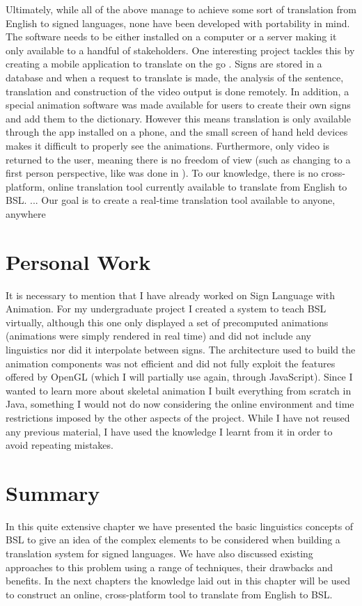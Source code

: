 \documentclass[12pt]{ociamthesis}  %
\begin{document}
Ultimately, while all of the above manage to achieve some sort of translation from English to signed languages, none have been developed with portability in mind. The software needs to be either installed on a computer or a server making it only available to a handful of stakeholders. One interesting project tackles this by creating a mobile application to translate on the go . Signs are stored in a database and when a request to translate is made, the analysis of the sentence, translation and construction of the video output is done remotely. In addition, a special animation software was made available for users to create their own signs and add them to the dictionary. However this means translation is only available through the app installed on a phone, and the small screen of hand held devices makes it difficult to properly see the animations. Furthermore, only video is returned to the user, meaning there is no freedom of view (such as changing to a first person perspective, like was done in ). To our knowledge, there is no cross-platform, online translation tool currently available  to translate from English to BSL. ... Our goal is to create a real-time translation tool available to anyone, anywhere

\section{Personal Work}
It is necessary to mention that I have already worked on Sign Language with Animation. For my undergraduate project I created a system to teach BSL virtually, although this one only displayed a set of precomputed animations (animations were simply rendered in real time) and did not include any linguistics nor did it interpolate between signs. The architecture used to build the animation components was not efficient and did not fully exploit the features offered by OpenGL (which I will partially use again, through JavaScript). Since I wanted to learn more about skeletal animation I built everything from scratch in Java, something I would not do now considering the online environment and time restrictions imposed by the other aspects of the project. While I have not reused any previous material, I have used the knowledge I learnt from it in order to avoid repeating mistakes.
\section{Summary}
In this quite extensive chapter we have presented the basic linguistics concepts of BSL to give an idea of the complex elements to be considered when building a translation system for signed languages. We have also discussed existing approaches to this problem using a range of techniques, their drawbacks and benefits. In the next chapters the knowledge laid out in this chapter will be used to construct an online, cross-platform tool to translate from English to BSL.
\end{document}
